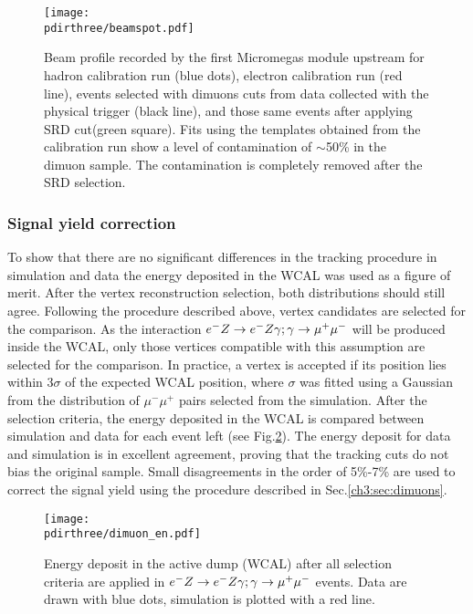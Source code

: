\begin{figure}[tbh!]
  \centering
    \texttt{[image: \\pdirthree/beamspot.pdf]}
  \caption[Beam profile with different cuts]{Beam profile recorded by the first Micromegas module upstream for hadron calibration run (blue dots), electron calibration run (red line), events selected with dimuons cuts from data collected with the physical trigger (black line), and those same events after applying SRD cut(green square). Fits using the templates obtained from the calibration run show a level of contamination of $\sim$50\% in the dimuon sample. The contamination is completely removed after the SRD selection.}
  \label{fig:dimuon:profile}
\end{figure}

\subsubsection{Signal yield correction}
\label{ch3:sec:dimuons-sig-corr}

To show that there are no significant differences in the tracking procedure in simulation and data the energy deposited in the WCAL was used as a figure of merit. After the vertex reconstruction selection, both distributions should still agree.
Following the procedure described above, vertex candidates are selected for the comparison. As the interaction $\emu$ will be produced inside the WCAL, only those vertices compatible with this assumption are selected for the comparison. In practice, a vertex is accepted if its position lies within 3$\sigma$ of the expected WCAL position, where $\sigma$ was fitted using a Gaussian from the distribution of $\mu^- \mu^+$ pairs selected from the simulation. After the selection criteria, the energy deposited in the WCAL is compared between simulation and data for each event left (see Fig.\ref{fig:dimuon_en}). The energy deposit for data and simulation is in excellent agreement, proving that the tracking cuts do not bias the original sample. Small disagreements in the order of 5\%-7\% are used to correct the signal yield using the procedure described in Sec.\ref{ch3:sec:dimuons}.

\begin{figure}[tbh!]
  \centering
    \texttt{[image: \\pdirthree/dimuon\_en.pdf]}
  \caption[$\emu$ MC-DATA comparison in visible mode]{Energy deposit in the active dump (WCAL) after all selection criteria are applied in $\emu$ events. Data are drawn with blue dots, simulation is plotted with a red line.}
  \label{fig:dimuon_en}
\end{figure}

